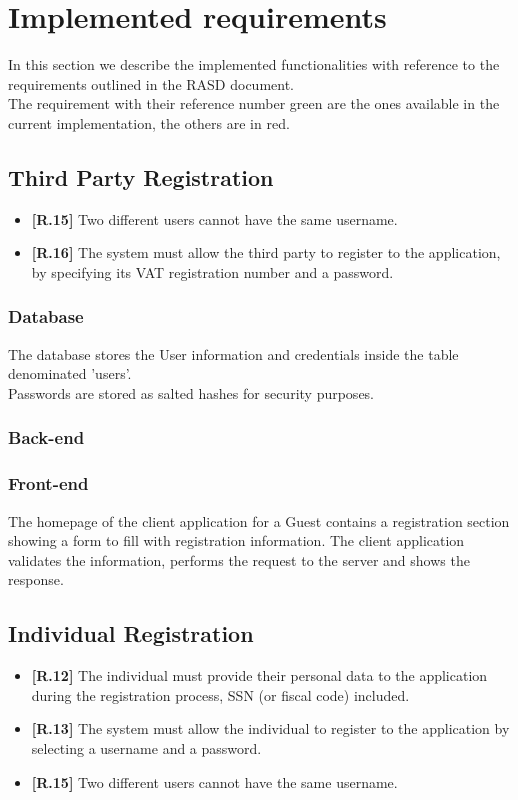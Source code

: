 \section{Implemented requirements}

In this section we describe the implemented functionalities with reference to the requirements outlined in the RASD document.\\
The requirement with their reference number green are the ones available in the current implementation, the others are in red.

\subsection{Third Party Registration}
\begin{itemize}
	\item {\color{ProcessBlue}\textbf{[R.15]}} Two different users cannot have the same username.
	\item {\color{ProcessBlue}\textbf{[R.16]}} The system must allow the third party to register to the application, by specifying its VAT registration number and a password.
\end{itemize}
\subsubsection*{Database}
The database stores the User information and credentials inside the table denominated 'users'.\\
Passwords are stored as salted hashes for security purposes.

\subsubsection*{Back-end}


\subsubsection*{Front-end}
The homepage of the client application for a Guest contains a registration section showing a form to fill with registration information. The client application validates the information, performs the request to the server and shows the response.

\subsection{Individual Registration}
\begin{itemize}
	\item {\color{ProcessBlue}\textbf{[R.12]}} The individual must provide their personal data to the application during the registration process, SSN (or fiscal code) included. 
	\item {\color{ProcessBlue}\textbf{[R.13]}} The system must allow the individual to register to the application by selecting a username and a password. 
	\item {\color{ProcessBlue}\textbf{[R.15]}} Two different users cannot have the same username.
\end{itemize}
